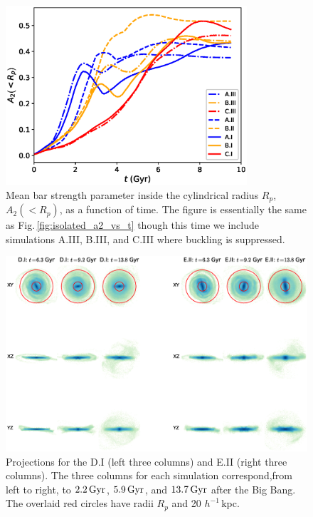 \begin{figure}
	\centering
	\includegraphics[width=0.8\textwidth]
{../figures/isolated_a2_vs_t_2rd_no_buckling_weighted.eps}
	\caption{Mean bar strength parameter inside the cylindrical
          radius $R_p$, $A_2(<R_p)$, as a function of time.  The
          figure is essentially the same as
          Fig.\,\ref{fig:isolated_a2_vs_t} though this time we include
          simulations A.III, B.III, and C.III where buckling is
          suppressed.} \label{fig:isolated_a2_vs_t_no_buckle}
\end{figure}


\begin{figure}
	\centering
	\includegraphics[width=\textwidth]{../figures/cosmo_three_by_threes.eps}
	\caption{Projections for the D.I (left three columns) and E.II
          (right three columns).  The three columns for each
          simulation correspond,from left to right, to $2.2\,{\rm
            Gyr}$, $5.9\,{\rm Gyr}$, and $13.7\,{\rm Gyr}$ after the
          Big Bang. The overlaid red circles have radii $R_p$ and 20
          $h^{-1} \,$kpc.} \label{fig:face_on_cosmo}
\end{figure}

